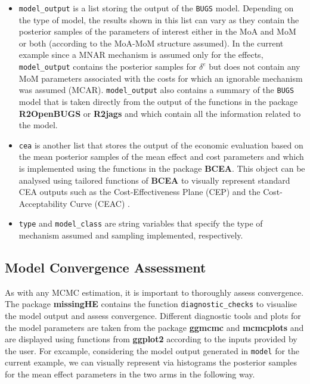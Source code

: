 \documentclass[]{article}
\begin{document}
\begin{itemize}
\item
  \texttt{model\_output} is a list storing the output of the
  \texttt{BUGS} model. Depending on the type of model, the results shown
  in this list can vary as they contain the posterior samples of the
  parameters of interest either in the MoA and MoM or both (according to
  the MoA-MoM structure assumed). In the current example since a MNAR
  mechanism is assumed only for the effects, \texttt{model\_output}
  contains the posterior samples for \(\delta^{e}\) but does not contain
  any MoM parameters associated with the costs for which an ignorable
  mechanism was assumed (MCAR). \texttt{model\_output} also contains a
  summary of the \texttt{BUGS} model that is taken directly from the
  output of the functions in the package \textbf{R2OpenBUGS} or
  \textbf{R2jags} and which contain all the information related to the
  model.
\item
  \texttt{cea} is another list that stores the output of the economic
  evaluation based on the mean posterior samples of the mean effect and
  cost parameters and which is implemented using the functions in the
  package \textbf{BCEA}. This object can be analysed using tailored
  functions of \textbf{BCEA} to visually represent standard CEA outputs
  such as the Cost-Effectiveness Plane (CEP) \citep{Black} and the
  Cost-Acceptability Curve (CEAC) \citep{VanHout}.
\item
  \texttt{type} and \texttt{model\_class} are string variables that
  specify the type of mechanism assumed and sampling implemented,
  respectively.
\end{itemize}

\subsection{Model Convergence
Assessment}\label{model-convergence-assessment}

As with any MCMC estimation, it is important to thoroughly assess
convergence. The package \textbf{missingHE} contains the function
\texttt{diagnostic\_checks} to visualise the model output and assess
convergence. Different diagnostic tools and plots for the model
parameters are taken from the package \textbf{ggmcmc} and
\textbf{mcmcplots} and are displayed using functions from
\textbf{ggplot2} according to the inputs provided by the user. For
excample, considering the model output generated in \texttt{model} for
the current example, we can visually represent via histograms the
posterior samples for the mean effect parameters in the two arms in the
following way.
\end{document}
